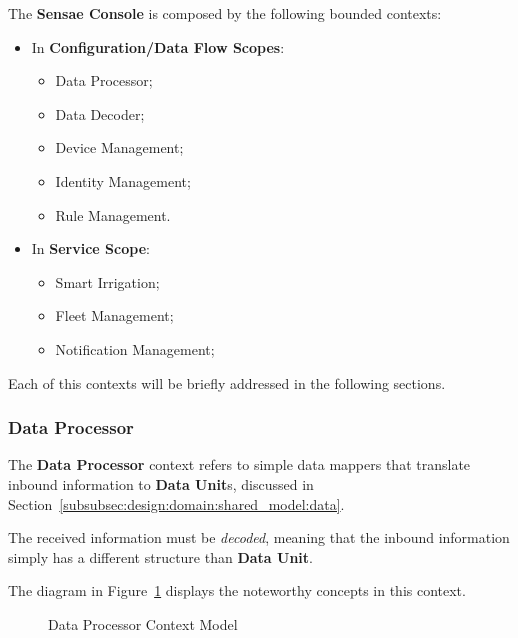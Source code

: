 The \textbf{Sensae Console} is composed by the following bounded contexts:

\begin{itemize}
   \item In \textbf{Configuration/Data Flow Scopes}:
   \begin{itemize}
      \item Data Processor;
      \item Data Decoder;
      \item Device Management;
      \item Identity Management;
      \item Rule Management.
   \end{itemize}
   \item In \textbf{Service Scope}:
   \begin{itemize}
      \item Smart Irrigation;
      \item Fleet Management;
      \item Notification Management;
   \end{itemize}
\end{itemize}

Each of this contexts will be briefly addressed in the following sections.

\subsubsection*{Data Processor}
\label{subsubsec:design:domain:bounded_contexts:processor}

The \textbf{Data Processor} context refers to simple data mappers that translate inbound information to \textbf{Data Unit}s, discussed in Section~\ref{subsubsec:design:domain:shared_model:data}.

The received information must be \textit{decoded}, meaning that the inbound information simply has a different structure than \textbf{Data Unit}.

The diagram in Figure~\ref{fig:design:domain:bounded_contexts:processor:diagram} displays the noteworthy concepts in this context.

\begin{figure}[H]
   \centering
  \resizebox{\columnwidth}{!}
  {
     
  }
  \caption[Data Processor Context Model]{Data Processor Context Model}
  \label{fig:design:domain:bounded_contexts:processor:diagram}
\end{figure}

